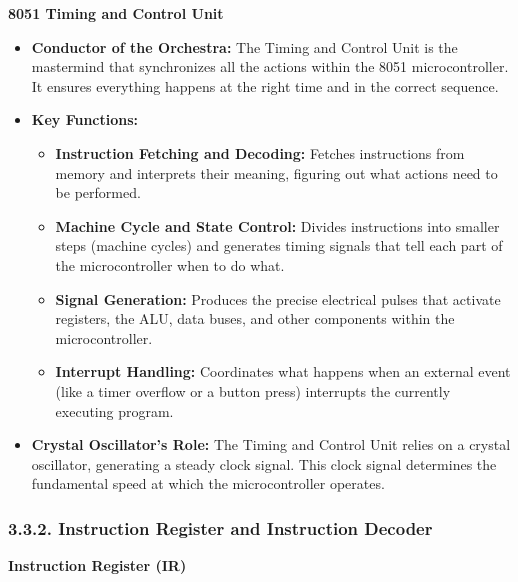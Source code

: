 \documentclass[
]{article}
\begin{document}
\textbf{8051 Timing and Control Unit}

\begin{itemize}
\item
  \textbf{Conductor of the Orchestra:} The Timing and Control Unit is
  the mastermind that synchronizes all the actions within the 8051
  microcontroller. It ensures everything happens at the right time and
  in the correct sequence.
\item
  \textbf{Key Functions:}

  \begin{itemize}
  \item
    \textbf{Instruction Fetching and Decoding:} Fetches instructions
    from memory and interprets their meaning, figuring out what actions
    need to be performed.
  \item
    \textbf{Machine Cycle and State Control:} Divides instructions into
    smaller steps (machine cycles) and generates timing signals that
    tell each part of the microcontroller when to do what.
  \item
    \textbf{Signal Generation:} Produces the precise electrical pulses
    that activate registers, the ALU, data buses, and other components
    within the microcontroller.
  \item
    \textbf{Interrupt Handling:} Coordinates what happens when an
    external event (like a timer overflow or a button press) interrupts
    the currently executing program.
  \end{itemize}
\item
  \textbf{Crystal Oscillator's Role:} The Timing and Control Unit relies
  on a crystal oscillator, generating a steady clock signal. This clock
  signal determines the fundamental speed at which the microcontroller
  operates.
\end{itemize}

\hypertarget{332-instruction-register-and-instruction-decoder}{%
\subsubsection{3.3.2. Instruction Register and Instruction
Decoder}\label{332-instruction-register-and-instruction-decoder}}

\textbf{Instruction Register (IR)}
\end{document}
